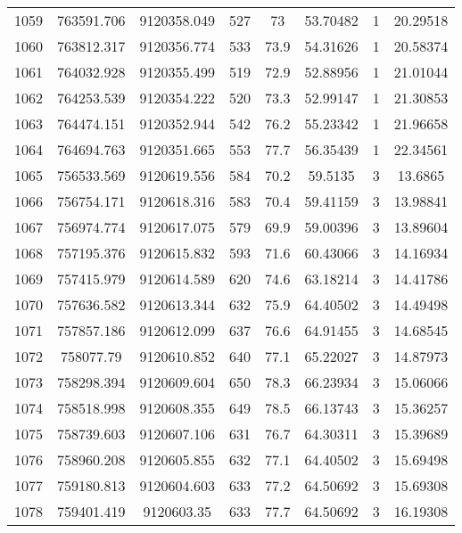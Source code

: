 \begin{longtable}{cccccccc}
1059 & 763591.706      & 9120358.049      & 527     & 73    & 53.70482 & 1  & 20.29518 \\
1060 & 763812.317      & 9120356.774      & 533     & 73.9  & 54.31626 & 1  & 20.58374 \\
1061 & 764032.928      & 9120355.499      & 519     & 72.9  & 52.88956 & 1  & 21.01044 \\
1062 & 764253.539      & 9120354.222      & 520     & 73.3  & 52.99147 & 1  & 21.30853 \\
1063 & 764474.151      & 9120352.944      & 542     & 76.2  & 55.23342 & 1  & 21.96658 \\
1064 & 764694.763      & 9120351.665      & 553     & 77.7  & 56.35439 & 1  & 22.34561 \\
1065 & 756533.569      & 9120619.556      & 584     & 70.2  & 59.5135  & 3  & 13.6865  \\
1066 & 756754.171      & 9120618.316      & 583     & 70.4  & 59.41159 & 3  & 13.98841 \\
1067 & 756974.774      & 9120617.075      & 579     & 69.9  & 59.00396 & 3  & 13.89604 \\
1068 & 757195.376      & 9120615.832      & 593     & 71.6  & 60.43066 & 3  & 14.16934 \\
1069 & 757415.979      & 9120614.589      & 620     & 74.6  & 63.18214 & 3  & 14.41786 \\
1070 & 757636.582      & 9120613.344      & 632     & 75.9  & 64.40502 & 3  & 14.49498 \\
1071 & 757857.186      & 9120612.099      & 637     & 76.6  & 64.91455 & 3  & 14.68545 \\
1072 & 758077.79       & 9120610.852      & 640     & 77.1  & 65.22027 & 3  & 14.87973 \\
1073 & 758298.394      & 9120609.604      & 650     & 78.3  & 66.23934 & 3  & 15.06066 \\
1074 & 758518.998      & 9120608.355      & 649     & 78.5  & 66.13743 & 3  & 15.36257 \\
1075 & 758739.603      & 9120607.106      & 631     & 76.7  & 64.30311 & 3  & 15.39689 \\
1076 & 758960.208      & 9120605.855      & 632     & 77.1  & 64.40502 & 3  & 15.69498 \\
1077 & 759180.813      & 9120604.603      & 633     & 77.2  & 64.50692 & 3  & 15.69308 \\
1078 & 759401.419      & 9120603.35       & 633     & 77.7  & 64.50692 & 3  & 16.19308 \\

\end{longtable}
